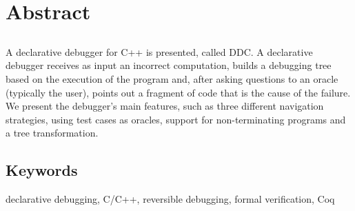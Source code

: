\chapter*{Abstract}

\section*{\tituloPortadaEngVal}

A declarative debugger for C++ is presented, called DDC. A declarative debugger receives as input an incorrect computation, builds a debugging tree based on the execution of the program and, after asking questions to an oracle (typically the user), points out a fragment of code that is the cause of the failure. We present the debugger’s main features, such as three different navigation strategies, using test cases as oracles, support for non-terminating programs and a tree transformation.

\section*{Keywords}

\noindent declarative debugging, C/C++, reversible debugging, formal verification, Coq



